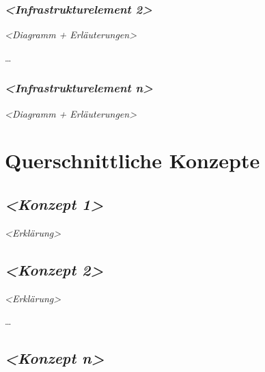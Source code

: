 \documentclass[
]{article}
\begin{document}
\hypertarget{__emphasis_infrastrukturelement_2_emphasis}{%
\subsubsection{\texorpdfstring{\emph{\textless Infrastrukturelement
2\textgreater{}}}{\textless Infrastrukturelement 2\textgreater{}}}\label{__emphasis_infrastrukturelement_2_emphasis}}

\emph{\textless Diagramm + Erläuterungen\textgreater{}}

\ldots{}

\hypertarget{__emphasis_infrastrukturelement_n_emphasis}{%
\subsubsection{\texorpdfstring{\emph{\textless Infrastrukturelement
n\textgreater{}}}{\textless Infrastrukturelement n\textgreater{}}}\label{__emphasis_infrastrukturelement_n_emphasis}}

\emph{\textless Diagramm + Erläuterungen\textgreater{}}

\hypertarget{section-concepts}{%
\section{Querschnittliche Konzepte}\label{section-concepts}}

\hypertarget{__emphasis_konzept_1_emphasis}{%
\subsection{\texorpdfstring{\emph{\textless Konzept
1\textgreater{}}}{\textless Konzept 1\textgreater{}}}\label{__emphasis_konzept_1_emphasis}}

\emph{\textless Erklärung\textgreater{}}

\hypertarget{__emphasis_konzept_2_emphasis}{%
\subsection{\texorpdfstring{\emph{\textless Konzept
2\textgreater{}}}{\textless Konzept 2\textgreater{}}}\label{__emphasis_konzept_2_emphasis}}

\emph{\textless Erklärung\textgreater{}}

\ldots{}

\hypertarget{__emphasis_konzept_n_emphasis}{%
\subsection{\texorpdfstring{\emph{\textless Konzept
n\textgreater{}}}{\textless Konzept n\textgreater{}}}\label{__emphasis_konzept_n_emphasis}}
\end{document}
